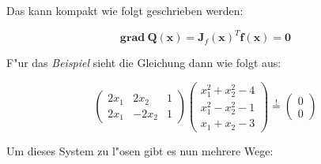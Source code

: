 \documentclass[german, 10pt, a4paper, twocolumn]{scrartcl}
\begin{document}
Das kann kompakt wie folgt geschrieben werden:

\begin{displaymath}
	\mathbf{grad} \: \mathbf{Q}(\mathbf{x})=\mathbf{J}_f(\mathbf{x})^T \mathbf{f}(\mathbf{x})=\mathbf{0}
\end{displaymath}

F"ur das \textit{Beispiel} sieht die Gleichung dann wie folgt aus:

\begin{displaymath}
	\left (
	\begin{array}{ccc}
		2x_1 &		2x_2 &		1\\
		2x_1 &		-2x_2 &		1
	\end{array}
	\right )
	\left (
	\begin{array}{c}
		x_1^2 + x_2^2 -4\\
		x_1^2 -x_2^2 -1\\
		x_1 + x_2 -3
	\end{array}
	\right )
	\stackrel{!}{=} 
	\left (
	\begin{array}{c}
		0\\
		0
	\end{array}
	\right )
\end{displaymath}

Um dieses System zu l"osen gibt es nun mehrere Wege:
\end{document}
